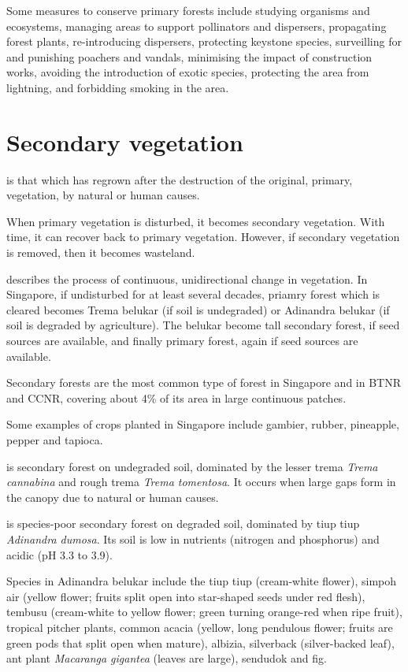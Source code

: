 \documentclass{slnotes}
\newcommand{\scn}[1]{\textit{#1}}
\begin{document}
Some measures to conserve primary forests include studying organisms and ecosystems, managing areas to support pollinators and dispersers, propagating forest plants, re-introducing dispersers, protecting keystone species, surveilling for and punishing poachers and vandals, minimising the impact of construction works, avoiding the introduction of exotic species, protecting the area from lightning, and forbidding smoking in the area.
\chapter{Secondary vegetation}
 is that which has regrown after the destruction of the original, primary, vegetation, by natural or human causes.

When primary vegetation is disturbed, it becomes secondary vegetation. With time, it can recover back to primary vegetation. However, if secondary vegetation is removed, then it becomes wasteland.

 describes the process of continuous, unidirectional change in vegetation. In Singapore, if undisturbed for at least several decades, priamry forest which is cleared becomes Trema belukar (if soil is undegraded) or Adinandra belukar (if soil is degraded by agriculture). The belukar become tall secondary forest, if seed sources are available, and finally primary forest, again if seed sources are available.

Secondary forests are the most common type of forest in Singapore and in BTNR and CCNR, covering about 4\% of its area in large continuous patches.

Some examples of crops planted in Singapore include gambier, rubber, pineapple, pepper and tapioca.

 is secondary forest on undegraded soil, dominated by the lesser trema \scn{Trema cannabina} and rough trema \scn{Trema tomentosa}. It occurs when large gaps form in the canopy due to natural or human causes.

 is species-poor secondary forest on degraded soil, dominated by tiup tiup \scn{Adinandra dumosa}. Its soil is low in nutrients (nitrogen and phosphorus) and acidic (pH 3.3 to 3.9).

Species in Adinandra belukar include the tiup tiup (cream-white flower), simpoh air (yellow flower; fruits split open into star-shaped seeds under red flesh), tembusu (cream-white to yellow flower; green turning orange-red when ripe fruit), tropical pitcher plants, common acacia (yellow, long pendulous flower; fruits are green pods that split open when mature), albizia, silverback (silver-backed leaf), ant plant \scn{Macaranga gigantea} (leaves are large), sendudok and fig.
\end{document}
